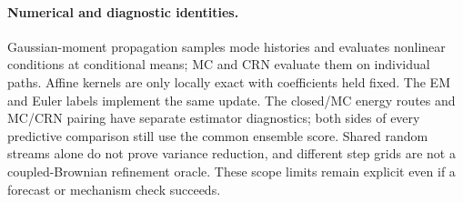 \paragraph{Numerical and diagnostic identities.}
Gaussian-moment propagation samples mode histories and evaluates nonlinear
conditions at conditional means; MC and CRN evaluate them on individual
paths. Affine kernels are only locally exact with coefficients held fixed.
The EM and Euler labels implement the same update. The closed/MC energy
routes and MC/CRN pairing have separate estimator diagnostics; both sides
of every predictive comparison still use the common ensemble score.
Shared random streams alone do not prove variance reduction, and different
step grids are not a coupled-Brownian refinement oracle. These scope limits
remain explicit even if a forecast or mechanism check succeeds.

